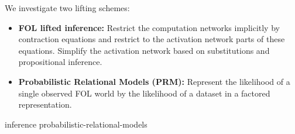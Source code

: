 We investigate two lifting schemes:
\begin{itemize}
    \item \textbf{FOL lifted inference:}
    Restrict the computation networks implicitly by contraction equations and restrict to the activation network parts of these equations.
    Simplify the activation network based on substitutions and propositional inference.
    \item \textbf{Probabilistic Relational Models (PRM):}
    Represent the likelihood of a single observed FOL world by the likelihood of a dataset in a factored representation.
\end{itemize}


{inference}
{probabilistic-relational-models}
